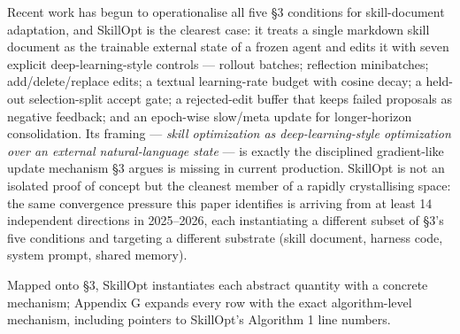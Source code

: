 Recent work has begun to operationalise all five §3 conditions for
skill-document adaptation, and SkillOpt \citep{yang2026skillopt} is the
clearest case: it treats a single markdown skill document as the
trainable external state of a frozen agent and edits it with seven
explicit deep-learning-style controls --- rollout batches; reflection
minibatches; add/delete/replace edits; a textual learning-rate budget
with cosine decay; a held-out selection-split accept gate; a
rejected-edit buffer that keeps failed proposals as negative feedback;
and an epoch-wise slow/meta update for longer-horizon consolidation. Its
framing --- \emph{skill optimization as deep-learning-style optimization
over an external natural-language state} --- is exactly the disciplined
gradient-like update mechanism §3 argues is missing in current
production. SkillOpt is not an isolated proof of concept but the
cleanest member of a rapidly crystallising space: the same convergence
pressure this paper identifies is arriving from at least 14 independent
directions in 2025--2026, each instantiating a different subset of §3's
five conditions and targeting a different substrate (skill document,
harness code, system prompt, shared memory).

Mapped onto §3, SkillOpt instantiates each abstract quantity with a
concrete mechanism; Appendix G expands every row with the exact
algorithm-level mechanism, including pointers to SkillOpt's Algorithm 1
line numbers.

